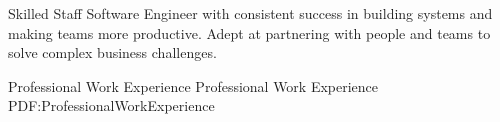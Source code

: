 \documentclass[MMMMyyyy,nonstopmode]{simpleresumecv_stacked}
\newcommand{\comment}[1]{\ignorespaces} %
\begin{document}
\begin{Body}

\item




\begin{center}
Skilled Staff Software Engineer with consistent success in building systems and making teams more productive.
Adept at partnering with people and teams to solve complex business challenges.

\end{center}



\Section
{Professional Work Experience}
{Professional Work Experience}
{PDF:ProfessionalWorkExperience}


\end{Body}
\end{document}
